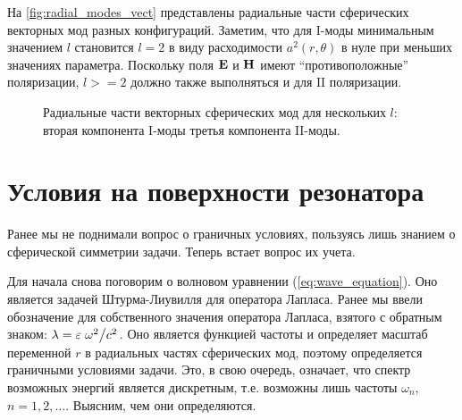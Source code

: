 \documentclass[12pt,a4paper]{article}
\begin{document}
        На \autoref{fig:radial_modes_vect} представлены радиальные части сферических векторных мод разных конфигураций. Заметим, что для $\mathrm{I}$-моды минимальным значением $l$ становится $l = 2$ в виду расходимости $a^2(r,\theta)$ в нуле при меньших значениях параметра. Поскольку поля $\vb{E}$ и $\vb{H}$ имеют \enquote{противоположные} поляризации, $l >= 2$ должно также выполняться и для $\mathrm{II}$ поляризации.
        \begin{figure}[h]
            \centering
            \hspace{8pt}%
            \hspace{8pt}%
            \caption[]{Радиальные части векторных сферических мод для нескольких $l$: %
                 вторая компонента $\mathrm{I}$-моды %
                 третья компонента $\mathrm{II}$-моды. %
            } %
            \label{fig:radial_modes_vect}%
        \end{figure}


    \section{Условия на поверхности резонатора}

        Ранее мы не поднимали вопрос о граничных условиях, пользуясь лишь знанием о сферической симметрии задачи. Теперь встает вопрос их учета.

        Для начала снова поговорим о волновом уравнении (\autoref{eq:wave_equation}). Оно является задачей Штурма-Лиувилля для оператора Лапласа. Ранее мы ввели обозначение для собственного значения оператора Лапласа, взятого с обратным знаком: $\lambda = \varepsilon \flatfrac{\omega^2}{c^2}$. Оно является функцией частоты и определяет масштаб переменной $r$ в радиальных частях сферических мод, поэтому определяется граничными условиями задачи. Это, в свою очередь, означает, что спектр возможных энергий является дискретным, т.е. возможны лишь частоты $\omega_n$, $n = 1, 2, \dots$. Выясним, чем они определяются.
\end{document}
